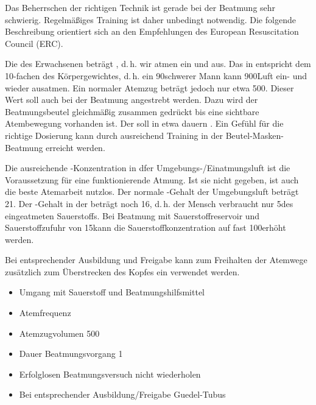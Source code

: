 {
Das Beherrschen der richtigen Technik ist gerade bei der
Beatmung sehr schwierig. Regelmäßiges Training ist daher
unbedingt notwendig. Die folgende Beschreibung orientiert
sich an den Empfehlungen des European Resuscitation Council
(ERC).

Die  des Erwachsenen beträgt
\PerMin*, d.\,h. wir atmen
\PerMin* ein und aus. Das
 in {\Ml}
entspricht dem 10-fachen des Körpergewichtes, d.\,h. ein
90\Kg* schwerer Mann kann 900\Ml* Luft ein- und wieder
ausatmen.
Ein normaler Atemzug beträgt jedoch nur etwa
500\Ml*{}. Dieser Wert soll auch
bei der Beatmung angestrebt werden. Dazu wird der
Beatmungsbeutel gleichmäßig zusammen gedrückt bis eine
sichtbare Atembewegung vorhanden ist. Der
 soll in etwa \EE{1\Sec*} dauern
\cite{Erc2010Sek02De}. Ein Gefühl für die richtige Dosierung
kann durch ausreichend Training in der
Beutel-Masken-Beatmung erreicht werden.

Die ausreichende -Konzentration in dfer
Umgebungs-/Einatmungsluft ist die Voraussetzung für eine
funktionierende Atmung. Ist sie nicht gegeben, ist auch die
beste Atemarbeit nutzlos. Der normale -Gehalt der
Umgebungsluft beträgt 21\PC*. Der -Gehalt in der
 beträgt noch 16\PC*, d.\,h. der Mensch
verbraucht  nur 5\PC* des eingeatmeten Sauerstoffs. Bei
Beatmung mit Sauerstoffreservoir und Sauerstoffzufuhr von
15\LPerMin* kann die Sauerstoffkonzentration auf fast
100\PC* erhöht werden.


Bei entsprechender Ausbildung und Freigabe kann zum
Freihalten der Atemwege zusätzlich zum
Überstrecken des Kopfes ein
 verwendet werden. 
}{
\begin{itemize}
  \item Umgang mit Sauerstoff und Beatmungshilfsmittel
  \item Atemfrequenz \PerMin*
  \item Atemzugvolumen 500\Ml*
  \item Dauer Beatmungsvorgang 1\Sec*
  \item Erfolglosen Beatmungsversuch nicht wiederholen
  \item Bei entsprechender Ausbildung/Freigabe
  Guedel-Tubus
\end{itemize}
}{}{}{}

